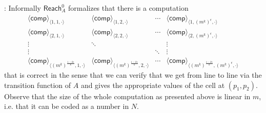 \documentclass{LMCS}
\newenvironment{proof}{\QuadSpace\par\noindent{\bf
Proof}:}{\EndProof\HalfSpace} \fi
\newcommand{\QuadSpace}{}\newcommand{\HalfSpace}{}\newcommand{\FullSpace}{}\newcommand{\EndProof}{ \hfill \vrule width 1ex height 1ex depth 0pt }
\newenvironment{proof}{

\smallskip
\noindent\emph{Proof.}}{\hfill\(\Box\)
\bigskip
} \fi
\begin{document}
\begin{proof}
  Informally $\mathsf{Reach}^0_A$ formalizes that there is a computation
  $$
\begin{matrix}
    \langle\mathsf{comp}\rangle_{\langle 1,1,\cdot\rangle} & \langle\mathsf{comp}\rangle_{\langle 1,2,\cdot\rangle} & \cdots &\langle\mathsf{comp}\rangle_{\langle 1,(m^k)^\epsilon,\cdot\rangle}\\
    \langle\mathsf{comp}\rangle_{\langle 2,1,\cdot\rangle} & \langle\mathsf{comp}\rangle_{\langle 2,2,\cdot\rangle} & \cdots &\langle\mathsf{comp}\rangle_{\langle 2,(m^k)^\epsilon,\cdot\rangle}\\
     \vdots    & \ddots & & \vdots\\
     \vdots    & & \ddots & \vdots\\
    \langle\mathsf{comp}\rangle_{\langle (m^k)^{\frac{1-k\epsilon}{k}},1,\cdot\rangle} & \langle\mathsf{comp}\rangle_{\langle (m^k)^{\frac{1-k\epsilon}{k}},2,\cdot\rangle} & \cdots &\langle\mathsf{comp}\rangle_{\langle (m^k)^{\frac{1-k\epsilon}{k}},(m^k)^\epsilon,\cdot\rangle}
  \end{matrix}
$$
  that is correct in the sense that we can verify that we get from line to line via the transition function of $A$ and gives the appropriate values of the cell at $(p_1,p_2)$. Observe that the size of the whole computation as presented above is linear in $m$, i.e. that it can be coded as a number in $N$.


\end{proof}
\end{document}
